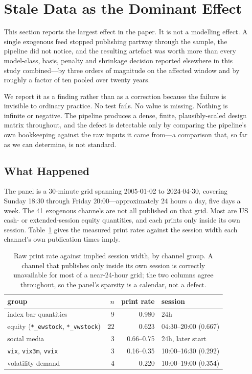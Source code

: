 \section{Stale Data as the Dominant Effect}
\label{sec:stale_data}

This section reports the largest effect in the paper. It is not a modelling
effect. A single exogenous feed stopped publishing partway through the sample,
the pipeline did not notice, and the resulting artefact was worth more than
every model-class, basis, penalty and shrinkage decision reported elsewhere in
this study combined---by three orders of magnitude on the affected window and
by roughly a factor of ten pooled over twenty years.

We report it as a finding rather than as a correction because the failure is
invisible to ordinary practice. No test fails. No value is missing. Nothing is
infinite or negative. The pipeline produces a dense, finite, plausibly-scaled
design matrix throughout, and the defect is detectable only by comparing the
pipeline's own bookkeeping against the raw inputs it came from---a comparison
that, so far as we can determine, is not standard.

\subsection{What Happened}

The panel is a 30-minute grid spanning 2005-01-02 to 2024-04-30, covering
Sunday 18:30 through Friday 20:00---approximately 24 hours a day, five days a
week. The 41 exogenous channels are not all published on that grid. Most are
US cash- or extended-session equity quantities, and each prints only inside its
own session. Table~\ref{tab:calendars} gives the measured print rates against
the session width each channel's own publication times imply.

\begin{table}[t]
\centering
\caption{Raw print rate against implied session width, by channel group. A
channel that publishes only inside its own session is correctly unavailable for
most of a near-24-hour grid; the two columns agree throughout, so the panel's
sparsity is a calendar, not a defect.}
\label{tab:calendars}
\begin{tabular}{lrrl}
\toprule
group & $n$ & print rate & session \\
\midrule
index bar quantities & 9 & 0.980 & 24h \\
equity (\texttt{*\_ewstock}, \texttt{*\_vwstock}) & 22 & 0.623 & 04:30--20:00 (0.667) \\
social media & 3 & 0.66--0.75 & 24h, later start \\
\texttt{vix}, \texttt{vix3m}, \texttt{vvix} & 3 & 0.16--0.35 & 10:00--16:30 (0.292) \\
volatility demand & 4 & 0.220 & 10:00--19:00 (0.354) \\
\bottomrule
\end{tabular}
\end{table}

